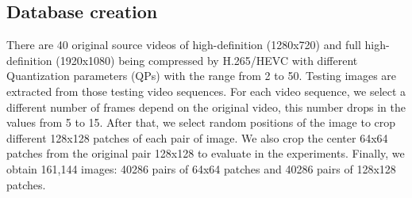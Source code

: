 \subsection{Database creation}

There are 40 original source videos of high-definition (1280x720) and full high-definition (1920x1080) being compressed by H.265/HEVC with different Quantization parameters (QPs) with the range from 2 to 50. Testing images are extracted from those testing video sequences. For each video sequence, we select a different number of frames depend on the original video, this number drops in the values from 5 to 15. After that, we select random positions of the image to crop different 128x128 patches of each pair of image. We also crop the center 64x64 patches from the original pair 128x128 to evaluate in the experiments. Finally, we obtain 161,144 images: 40286 pairs of 64x64 patches and 40286 pairs of 128x128 patches.


